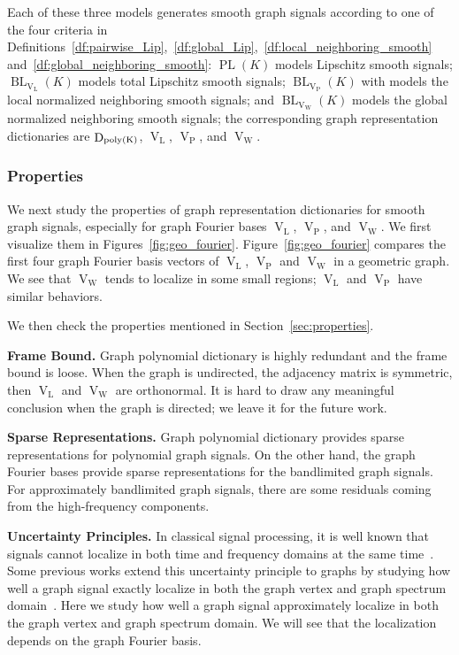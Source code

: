 \documentclass[journal,twocolumn,10pt]{IEEEtran}
\theoremstyle{definition}
\newcommand{\mypar}[1]{{\bf #1.}}
\DeclareMathOperator{\LL}{L}
\DeclareMathOperator{\BL}{BL}
\DeclareMathOperator{\PL}{PL}
\DeclareMathOperator{\D}{D}
\DeclareMathOperator{\Pj}{P}
\DeclareMathOperator{\Vm}{V}
\DeclareMathOperator{\W}{W}
\begin{document}
Each of these three models generates smooth graph signals according to one of the four criteria in Definitions~\ref{df:pairwise_Lip},~\ref{df:global_Lip},~\ref{df:local_neighboring_smooth} and~\ref{df:global_neighboring_smooth}: $\PL(K)$ models Lipschitz smooth signals; $\BL_{\Vm_{\LL}}(K)$ models total Lipschitz smooth signals; $\BL_{\Vm_{\Pj}}(K)$ with  models the local normalized neighboring smooth signals; and $\BL_{\Vm_{\W}}(K)$ models the global normalized neighboring smooth signals; the corresponding graph representation dictionaries are $\D_{\rm poly(K)}$, $\Vm_{\LL}$, $\Vm_{\Pj}$, and $\Vm_{\W}$.


\subsubsection{Properties}
 We next study the properties of graph representation dictionaries for smooth graph signals, especially for graph Fourier bases $\Vm_{\LL}$, $\Vm_{\Pj}$, and $\Vm_{\W}$. We first visualize them in Figures~\ref{fig:geo_fourier}. Figure~\ref{fig:geo_fourier} compares the first four graph Fourier basis vectors of $\Vm_{\LL}$, $\Vm_{\Pj}$ and $\Vm_{\W}$ in a geometric graph. We see that $\Vm_{\W}$ tends to localize in some small regions; $\Vm_{\LL}$ and $\Vm_{\Pj}$ have similar behaviors. 
 
 We then check the properties mentioned in Section~\ref{sec:properties}.
 
 \mypar{Frame Bound} Graph polynomial dictionary is highly redundant and the frame bound is loose. When the graph is undirected, the adjacency matrix is symmetric, then $\Vm_{\LL}$ and $\Vm_{\W}$ are orthonormal. It is hard to draw any meaningful conclusion when the graph is directed; we leave it for the future work.
  
 \mypar{Sparse Representations} Graph polynomial dictionary provides sparse representations for polynomial graph signals. On the other hand, the graph Fourier bases provide sparse representations for the bandlimited graph signals. For approximately bandlimited graph signals, there are some residuals coming from the high-frequency components.
 
 \mypar{Uncertainty Principles} In classical signal processing, it is well known that signals cannot localize in both time and frequency domains at the same time~\cite{VetterliKG:12, DonohoS:89}. Some previous works extend this uncertainty principle to graphs by studying how well a graph signal exactly localize in both the graph vertex and graph spectrum domain~\cite{AgaskarL:13, TsitsveroBL:15}. Here we study how well a graph signal approximately localize in both the graph vertex and graph spectrum domain. We will see that the localization depends on the graph Fourier basis.
   
\end{document}
